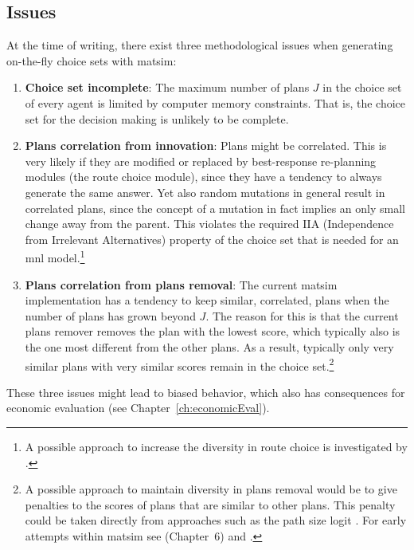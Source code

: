 \subsection{Issues}
\label{sec:Evolution-of-choice:issues}
%
At the time of writing, there exist three methodological issues when generating on-the-fly choice sets with \acrshort{matsim}:
%
\begin{enumerate}\styleEnumerate
\item \textbf{Choice set incomplete}: The maximum number of plans $J$ in the choice set of every agent is limited by computer memory constraints. That is, the choice set for the decision making is unlikely to be complete.
%
\item \textbf{Plans correlation from innovation}: Plans might be correlated. This is very likely if they are modified or replaced by best-response re-planning modules (\eg the route choice module), since they have a tendency to always generate the same answer. Yet also random mutations in general result in correlated plans, since the concept of a mutation in fact implies an only small change away from the parent.  This violates the required IIA (Independence from Irrelevant Alternatives) 
property of the choice set that is needed for an \gls{mnl} 
model.\footnote{%
%
A possible approach to increase the diversity in route choice is investigated by \citet{NagelKickhoeferJoubert2014HeterogeneousVoTsPROCEDIA}.
%
}

\item \textbf{Plans correlation from plans removal}: The current \acrshort{matsim} implementation has a tendency to keep similar, \ie  correlated, plans when the number of plans has grown beyond $J$.  The reason for this is that the current plans remover removes the plan with the lowest score, which typically also is the one most different from the other plans.  As a result, typically only very similar plans with very similar scores remain in the choice set.\footnote{%
%
A possible approach to maintain diversity in plans removal would be to give penalties to the scores of plans that are similar to other plans.  This penalty could be taken directly from approaches such as the path size logit \citep{DaganzoSheffi1977SUE,FrejingerBierlaire2007PathSizeLogit}.  For early attempts within \acrshort{matsim} see \cite{Grether2014PhD} (Chapter~6) and \cite{NeumannEtAlPassengerArrivalPatterns}.
%
}
%
\end{enumerate}
%
These three issues might lead to biased behavior, which also has consequences for economic evaluation (see Chapter~\ref{ch:economicEval}).

